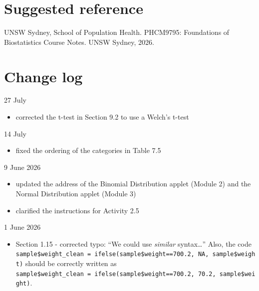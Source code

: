 \documentclass[
  a4paper,
]{memoir}
\providecommand{\tightlist}{%
  \setlength{\itemsep}{0pt}\setlength{\parskip}{0pt}}
\begin{document}
\section*{Suggested reference}\label{suggested-reference}


UNSW Sydney, School of Population Health. PHCM9795: Foundations of
Biostatistics Course Notes. UNSW Sydney, 2026.

\section*{Change log}\label{change-log}


27 July

\begin{itemize}
\tightlist
\item
  corrected the t-test in Section 9.2 to use a Welch's t-test
\end{itemize}

14 July

\begin{itemize}
\tightlist
\item
  fixed the ordering of the categories in Table 7.5
\end{itemize}

9 June 2026

\begin{itemize}
\tightlist
\item
  updated the address of the Binomial Distribution applet (Module 2) and
  the Normal Distribution applet (Module 3)
\item
  clarified the instructions for Activity 2.5
\end{itemize}

1 June 2026

\begin{itemize}
\tightlist
\item
  Section 1.15 - corrected typo: ``We could use \emph{similar}
  syntax\ldots{}'' Also, the code
  \texttt{sample\$weight\_clean\ =\ ifelse(sample\$weight==700.2,\ NA,\ sample\$weight)}
  should be correctly written as
  \texttt{sample\$weight\_clean\ =\ ifelse(sample\$weight==700.2,\ 70.2,\ sample\$weight)}.
\end{itemize}

\end{document}
